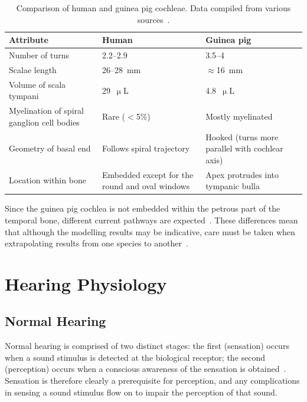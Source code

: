 \begin{table}[p]
	\centering
	\sffamily
	\small
	
	\caption[Comparison of human and guinea pig cochleae]{Comparison of human and
	guinea pig cochleae. Data compiled from various
	sources~\cite{black1980,ota1980,nadol1988comparative,thorne1999,frijns2001,erixon2009}.}
	\label{table:cochleae_comparison}
	
    \begin{tabular}{p{4.5cm} p{4.0cm} p{5.2cm}}
		\toprule
		\textbf{Attribute}	& \textbf{Human}	& \textbf{Guinea pig} \\
		\midrule
		
		Number of turns				& 2.2--2.9				& 3.5--4 \\
		Scalae length				& 26--28~mm				& $ \approx $16~mm \\
		Volume of scala tympani		& 29~$ \upmu $L			& 4.8~$ \upmu $L \\
		Myelination	of spiral ganglion cell bodies		& Rare ($<$5\%) &	Mostly
			myelinated \\
		Geometry of basal end		& Follows spiral trajectory
									& Hooked (turns more parallel with cochlear axis) \\ 
		Location within bone		& Embedded except for the round and oval windows
									& Apex protrudes into tympanic bulla \\
		\bottomrule
	\end{tabular}
		
\end{table}

Since the guinea pig cochlea is not embedded within the petrous part of the
temporal bone, different current pathways are expected~\cite{kral1998}.
These differences mean that although the modelling results may be indicative,
care must be taken when extrapolating results from one species to
another~\cite{frijns2001}.


\section{Hearing Physiology}

\subsection{Normal Hearing}
\label{sect:normal_hearing}

Normal hearing is comprised of two distinct stages: the first (sensation) occurs
when a sound stimulus is detected at the biological receptor; the second
(perception) occurs when a conscious awareness of the sensation is
obtained~\cite{martini2006}. Sensation is therefore clearly a prerequisite for
perception, and any complications in sensing a sound stimulus flow on to impair
the perception of that sound.

